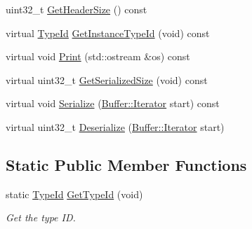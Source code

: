 \begin{DoxyCompactItemize}
uint32\+\_\+t \hyperlink{classns3_1_1EthernetHeader_a2c09fc111b75f8e49562edcd8878c205}{Get\+Header\+Size} () const 
\item 
virtual \hyperlink{classns3_1_1TypeId}{Type\+Id} \hyperlink{classns3_1_1EthernetHeader_a0eb8f7e4608980e29f964eded22a64e8}{Get\+Instance\+Type\+Id} (void) const 
\item 
virtual void \hyperlink{classns3_1_1EthernetHeader_a76369e7105c661e8e23bd4d96161238e}{Print} (std\+::ostream \&os) const 
\item 
virtual uint32\+\_\+t \hyperlink{classns3_1_1EthernetHeader_a6dfd391cc93668a32f832661a082c5b2}{Get\+Serialized\+Size} (void) const 
\item 
virtual void \hyperlink{classns3_1_1EthernetHeader_ae628046c64921b18962e062c0e7dd5b7}{Serialize} (\hyperlink{classns3_1_1Buffer_1_1Iterator}{Buffer\+::\+Iterator} start) const 
\item 
virtual uint32\+\_\+t \hyperlink{classns3_1_1EthernetHeader_a2bcb7450f96588a8a1bb6ca132184424}{Deserialize} (\hyperlink{classns3_1_1Buffer_1_1Iterator}{Buffer\+::\+Iterator} start)
\end{DoxyCompactItemize}
\subsection*{Static Public Member Functions}
\begin{DoxyCompactItemize}
\item 
static \hyperlink{classns3_1_1TypeId}{Type\+Id} \hyperlink{classns3_1_1EthernetHeader_a4908142379f3de73a72ab84131a0b457}{Get\+Type\+Id} (void)
\begin{DoxyCompactList}\small\item\em Get the type ID. \end{DoxyCompactList}\end{DoxyCompactItemize}
